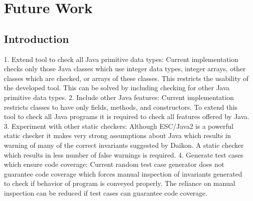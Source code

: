 \chapter{Future Work}
\label{chap:futureWork}

\section{Introduction}\label{sec:intro8}
	
1. Extend tool to check all Java primitive data types: Current implementation checks only those Java classes which use integer data types, integer arrays, other classes which are checked, or arrays of these classes. This restricts the usability of the developed tool. This can be solved by including checking for other Java primitive data types. 2. Include other Java features: Current implementation restricts classes to have only fields, methods, and constructors. To extend this tool to check all Java programs it is required to check all features offered by Java. 3. Experiment with other static checkers: Although ESC/Java2 is a powerful static checker it makes very strong assumptions about Java which results in warning of many of the correct invariants suggested by Daikon. A static checker which results in less number of false warnings is required. 4. Generate test cases which ensure code coverage: Current random test case generator does not guarantee code coverage which forces manual inspection of invariants generated to check if behavior of program is conveyed properly. The reliance on manual inspection can be reduced if test cases can guarantee code coverage.


